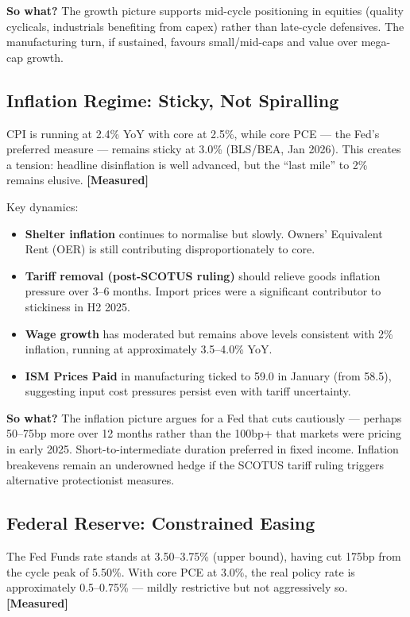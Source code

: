\documentclass{wilson-report}
\begin{document}
\textbf{So what?} The growth picture supports mid-cycle positioning in equities (quality cyclicals, industrials benefiting from capex) rather than late-cycle defensives. The manufacturing turn, if sustained, favours small/mid-caps and value over mega-cap growth.

\subsection{Inflation Regime: Sticky, Not Spiralling}

CPI is running at 2.4\% YoY with core at 2.5\%, while core PCE --- the Fed's preferred measure --- remains sticky at 3.0\% (BLS/BEA, Jan 2026). This creates a tension: headline disinflation is well advanced, but the ``last mile'' to 2\% remains elusive. \textbf{[Measured]}

Key dynamics:
\begin{itemize}[leftmargin=1.2em, itemsep=2pt]
  \item \textbf{Shelter inflation} continues to normalise but slowly. Owners' Equivalent Rent (OER) is still contributing disproportionately to core.
  \item \textbf{Tariff removal (post-SCOTUS ruling)} should relieve goods inflation pressure over 3--6 months. Import prices were a significant contributor to stickiness in H2 2025.
  \item \textbf{Wage growth} has moderated but remains above levels consistent with 2\% inflation, running at approximately 3.5--4.0\% YoY.
  \item \textbf{ISM Prices Paid} in manufacturing ticked to 59.0 in January (from 58.5), suggesting input cost pressures persist even with tariff uncertainty.
\end{itemize}

\textbf{So what?} The inflation picture argues for a Fed that cuts cautiously --- perhaps 50--75bp more over 12 months rather than the 100bp+ that markets were pricing in early 2025. Short-to-intermediate duration preferred in fixed income. Inflation breakevens remain an underowned hedge if the SCOTUS tariff ruling triggers alternative protectionist measures.

\subsection{Federal Reserve: Constrained Easing}

The Fed Funds rate stands at 3.50--3.75\% (upper bound), having cut 175bp from the cycle peak of 5.50\%. With core PCE at 3.0\%, the real policy rate is approximately 0.5--0.75\% --- mildly restrictive but not aggressively so. \textbf{[Measured]}
\end{document}
